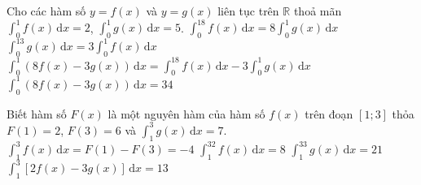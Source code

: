 \begin{ex}%
	Cho  các hàm số $y=f(x)$ và $y=g(x)$ liên tục trên $\mathbb{R}$ thoả mãn $
	\displaystyle\int_0^1f(x) \mathrm{\,d}x=2$,  $\displaystyle\int_0^1g(x) \mathrm{\,d}x=5$.
	 \choiceTF
		{$\displaystyle\int_0^18f(x)\mathrm{\,d}x=8\displaystyle\int_0^1g(x)\mathrm{\,d}x$} 
		 {$\displaystyle\int_0^13g(x)\mathrm{\,d}x=3\displaystyle\int_0^1f(x)\mathrm{\,d}x$}
		{\True $\displaystyle\int_0^1\left(8f(x)-3 g(x)\right)\mathrm{\,d}x=\displaystyle\int_0^18f(x)\mathrm{\,d}x-3\displaystyle\int_0^1g(x)\mathrm{\,d}x$} 
		 {$\displaystyle\int_0^1\left(8f(x)-3g(x)\right)\mathrm{\,d}x=34$}
\end{ex}

\begin{ex}%
	Biết hàm số $F(x)$ là một nguyên hàm của  hàm số $f(x)$ trên đoạn $[1;3]$ thỏa $F(1)=2$, $F(3)=6$ và $\displaystyle\int_1^3g(x)\mathrm{\,d}x=7$.
	\choiceTF 
		 {$\displaystyle\int_1^3f(x)\mathrm{\,d}x=F(1)-F(3)=-4$}
		 {\True $\displaystyle\int_1^32f(x)\mathrm{\,d}x=8$}
		{\True $\displaystyle\int_1^33g(x)\mathrm{\,d}x=21$} 
		{$\displaystyle\int_1^3[2f(x)-3g(x)]\mathrm{\,d}x=13$} 
\end{ex}


